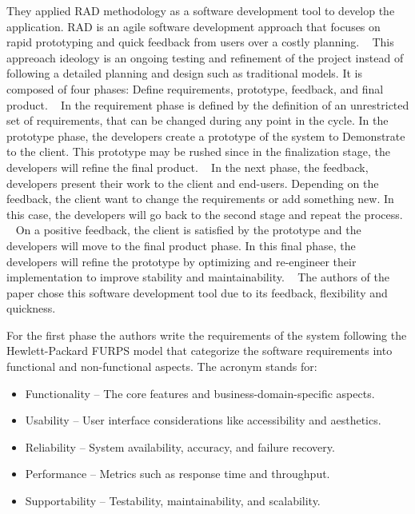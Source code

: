 They applied \ac{RAD} methodology as a software development tool to develop the application.
\ac{RAD} is an agile software development approach that focuses on rapid prototyping and quick feedback from users over a costly planning. ~\cite{rapid_app_development}
This appreoach ideology is an ongoing testing and refinement of the project instead of following a detailed planning and design such as traditional models.
It is composed of four phases: Define requirements, prototype, feedback, and final product. ~\cite{rapid_app_development}
In the requirement phase is defined by the definition of an unrestricted set of requirements, that can be changed during any point in the cycle. 
In the prototype phase, the developers create a prototype of the system to Demonstrate to the client. 
This prototype may be rushed since in the finalization stage, the developers will refine the final product. ~\cite{rapid_app_development}
In the next phase, the feedback, developers present their work to the client and end-users.
Depending on the feedback, the client want to change the requirements or add something new. In this case, the developers will go back to the second stage and repeat the process. ~\cite{rapid_app_development}
On a positive feedback, the client is satisfied by the prototype and the developers will move to the final product phase.
In this final phase, the developers will refine the prototype by optimizing and re-engineer their implementation to improve stability and maintainability. ~\cite{rapid_app_development}
The authors of the paper chose this software development tool due to its feedback, flexibility and quickness.

For the first phase the authors write the requirements of the system following the Hewlett-Packard \ac{FURPS} model that categorize the software requirements into functional and non-functional aspects.
The acronym stands for:

\begin{itemize}
  \item Functionality – The core features and business-domain-specific aspects.
  \item Usability – User interface considerations like accessibility and aesthetics.
  \item Reliability – System availability, accuracy, and failure recovery.
  \item Performance – Metrics such as response time and throughput.
  \item Supportability – Testability, maintainability, and scalability.
\end{itemize}

